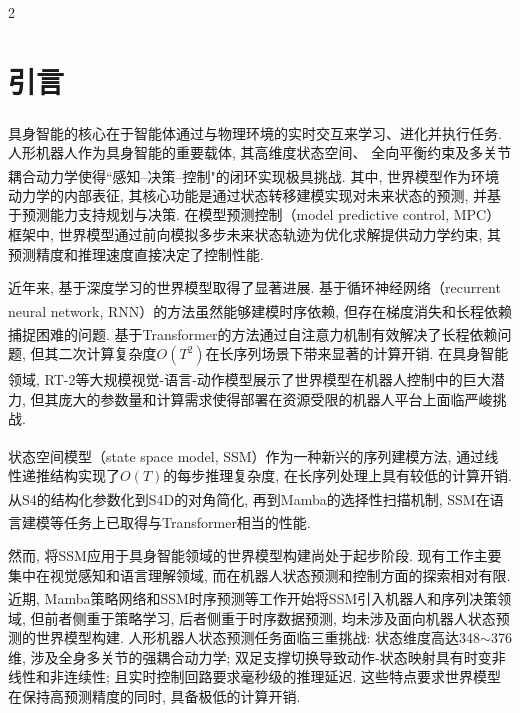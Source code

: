 \renewcommand\refname{\normalsize{{\CJKfamily{hei}参考文献}}}
\setlength{\oddsidemargin}{-.5cm}
 \setlength{\textwidth}{171mm}
\vspace{10pt}
\enlargethispage{-10mm}
\begin{multicols}{2}
\fontsize{10.5bp}{12.9bp}\selectfont

\section{引言}

具身智能的核心在于智能体通过与物理环境的实时交互来学习、进化并执行任务\textsuperscript{\cite{1}}.
人形机器人作为具身智能的重要载体, 其高维度状态空间、
全向平衡约束及多关节耦合动力学使得``感知--决策--控制"的闭环实现极具挑战.
其中, 世界模型\textsuperscript{\cite{2}}作为环境动力学的内部表征, 其核心功能是通过状态转移建模实现对未来状态的预测, 并基于预测能力支持规划与决策.
在模型预测控制（model predictive control, MPC）框架中,
世界模型通过前向模拟多步未来状态轨迹为优化求解提供动力学约束,
其预测精度和推理速度直接决定了控制性能.

近年来, 基于深度学习的世界模型取得了显著进展.
基于循环神经网络（recurrent neural network, RNN）的方法\textsuperscript{\cite{3}}虽然能够建模时序依赖, 但存在梯度消失和长程依赖捕捉困难的问题.
基于Transformer的方法\textsuperscript{\cite{4}}通过自注意力机制有效解决了长程依赖问题,
但其二次计算复杂度$O(T^2)$在长序列场景下带来显著的计算开销.
在具身智能领域, RT-2\textsuperscript{\cite{5}}等大规模视觉-语言-动作模型展示了世界模型在机器人控制中的巨大潜力,
但其庞大的参数量和计算需求使得部署在资源受限的机器人平台上面临严峻挑战.

状态空间模型（state space model, SSM）\textsuperscript{\cite{6}}作为一种新兴的序列建模方法,
通过线性递推结构实现了$O(T)$的每步推理复杂度, 在长序列处理上具有较低的计算开销.
从S4的结构化参数化到S4D\textsuperscript{\cite{7}}的对角简化,
再到Mamba\textsuperscript{\cite{8}}的选择性扫描机制, SSM在语言建模等任务上已取得与Transformer相当的性能\textsuperscript{\cite{9}}.

然而, 将SSM应用于具身智能领域的世界模型构建尚处于起步阶段.
现有工作主要集中在视觉感知和语言理解领域,
而在机器人状态预测和控制方面的探索相对有限.
近期, Mamba策略网络\textsuperscript{\cite{10,11}}和SSM时序预测\textsuperscript{\cite{12}}等工作开始将SSM引入机器人和序列决策领域,
但前者侧重于策略学习, 后者侧重于时序数据预测,
均未涉及面向机器人状态预测的世界模型构建.
人形机器人状态预测任务面临三重挑战: 状态维度高达348$\sim$376维, 涉及全身多关节的强耦合动力学; 双足支撑切换导致动作-状态映射具有时变非线性和非连续性; 且实时控制回路要求毫秒级的推理延迟.
这些特点要求世界模型在保持高预测精度的同时, 具备极低的计算开销.


\end{multicols}

